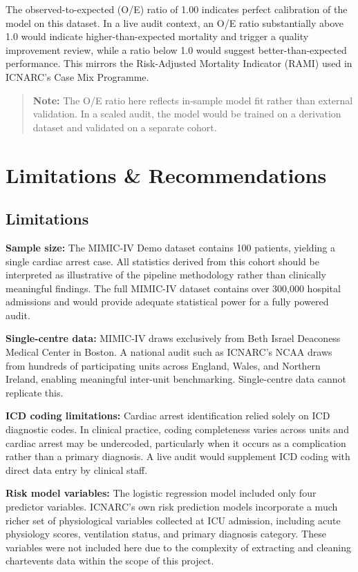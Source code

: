 \documentclass[
]{article}
\begin{document}
The observed-to-expected (O/E) ratio of 1.00 indicates perfect
calibration of the model on this dataset. In a live audit context, an
O/E ratio substantially above 1.0 would indicate higher-than-expected
mortality and trigger a quality improvement review, while a ratio below
1.0 would suggest better-than-expected performance. This mirrors the
Risk-Adjusted Mortality Indicator (RAMI) used in ICNARC's Case Mix
Programme.

\begin{quote}
\textbf{Note:} The O/E ratio here reflects in-sample model fit rather
than external validation. In a scaled audit, the model would be trained
on a derivation dataset and validated on a separate cohort.
\end{quote}

\section{Limitations \&
Recommendations}\label{limitations-recommendations}

\subsection{Limitations}\label{limitations}

\textbf{Sample size:} The MIMIC-IV Demo dataset contains 100 patients,
yielding a single cardiac arrest case. All statistics derived from this
cohort should be interpreted as illustrative of the pipeline methodology
rather than clinically meaningful findings. The full MIMIC-IV dataset
contains over 300,000 hospital admissions and would provide adequate
statistical power for a fully powered audit.

\textbf{Single-centre data:} MIMIC-IV draws exclusively from Beth Israel
Deaconess Medical Center in Boston. A national audit such as ICNARC's
NCAA draws from hundreds of participating units across England, Wales,
and Northern Ireland, enabling meaningful inter-unit benchmarking.
Single-centre data cannot replicate this.

\textbf{ICD coding limitations:} Cardiac arrest identification relied
solely on ICD diagnostic codes. In clinical practice, coding
completeness varies across units and cardiac arrest may be undercoded,
particularly when it occurs as a complication rather than a primary
diagnosis. A live audit would supplement ICD coding with direct data
entry by clinical staff.

\textbf{Risk model variables:} The logistic regression model included
only four predictor variables. ICNARC's own risk prediction models
incorporate a much richer set of physiological variables collected at
ICU admission, including acute physiology scores, ventilation status,
and primary diagnosis category. These variables were not included here
due to the complexity of extracting and cleaning chartevents data within
the scope of this project.
\end{document}
